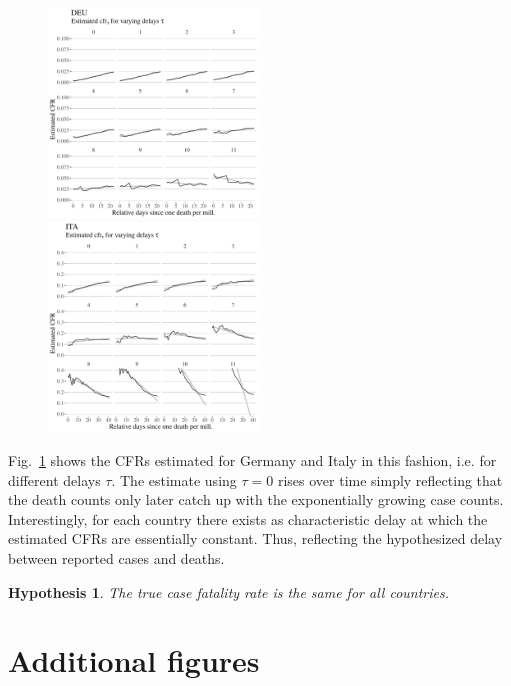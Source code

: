 \documentclass[fullpage,a4paper]{article}
\newcommand{\fig}[1]{Fig.~\ref{fig:#1}}
\newtheorem{hypothesis}{Hypothesis}
\begin{document}
\begin{figure}
  \includegraphics[width=0.495\textwidth]{../figs/ecdc_cfr_delay_DEU.pdf}
  \includegraphics[width=0.495\textwidth]{../figs/ecdc_cfr_delay_ITA.pdf}
  \caption{\label{fig:cfr}}
\end{figure}
\fig{cfr} shows the CFRs estimated for Germany and Italy in this
fashion, i.e. for different delays $\tau$. The estimate using $\tau =
0$ rises over time simply reflecting that the death counts only later
catch up with the exponentially growing case counts. Interestingly,
for each country there exists as characteristic delay at which the
estimated CFRs are essentially constant. Thus, reflecting the
hypothesized delay between reported cases and deaths.

\begin{hypothesis}
  \label{hyp:cfr}
  The true case fatality rate is the same for all countries.
\end{hypothesis}






\clearpage

\appendix

\section{Additional figures}
\end{document}
